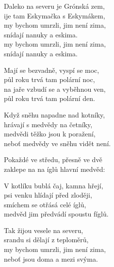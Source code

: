 
\ve{}
Daleko na severu je Grónská zem,\\
ije tam Eskymačka s Eskymákem,\\
my bychom umrzli, jim není zima, \\
snídají nanuky a eskima. \\
my bychom umrzli, jim není zima, \\
snídají nanuky a eskima. 

\ve{}
Mají se bezvadně, vyspí se moc,\\
půl roku trvá tam polární noc,\\
na jaře vzbudí se a vyběhnou ven,\\
půl roku trvá tam polární den.

\ve{}
Když sněhu napadne nad kotníky,\\
hrávají s medvědy na četníky,\\
medvědi těžko jsou k poražení,\\
neboť medvědy ve sněhu vidět není.

\ve{}
Pokaždé ve středu, přesně ve dvě\\
zaklepe na na íglů hlavní medvěd:\\

\ve{}
V kotlíku bublá čaj, kamna hřejí,\\
psi venku hlídají před zloději,\\
smíchem se otřásá celé íglů,\\
medvěd jim předvádí spoustu fíglů.

\ve{}
Tak žijou vesele na severu,\\
srandu si dělají z teploměrů,\\
my bychom umrzli, jim není zima,\\ 
neboť jsou doma a mezi svýma.

\esong